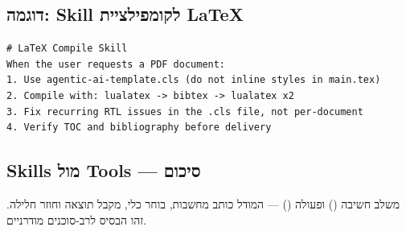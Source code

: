 \subsection{דוגמה: Skill לקומפילציית LaTeX}

\begin{lstlisting}[caption={קטע מתוך Skill לייצור PDF}]
# LaTeX Compile Skill
When the user requests a PDF document:
1. Use agentic-ai-template.cls (do not inline styles in main.tex)
2. Compile with: lualatex -> bibtex -> lualatex x2
3. Fix recurring RTL issues in the .cls file, not per-document
4. Verify TOC and bibliography before delivery
\end{lstlisting}

\subsection{Skills מול Tools --- סיכום}


\begin{insightbox}
 \cite{yao2023react} משלב חשיבה () ופעולה
() --- המודל כותב מחשבות, בוחר כלי, מקבל תוצאה וחוזר חלילה.
זהו הבסיס לרב-סוכנים מודרניים.
\end{insightbox}
